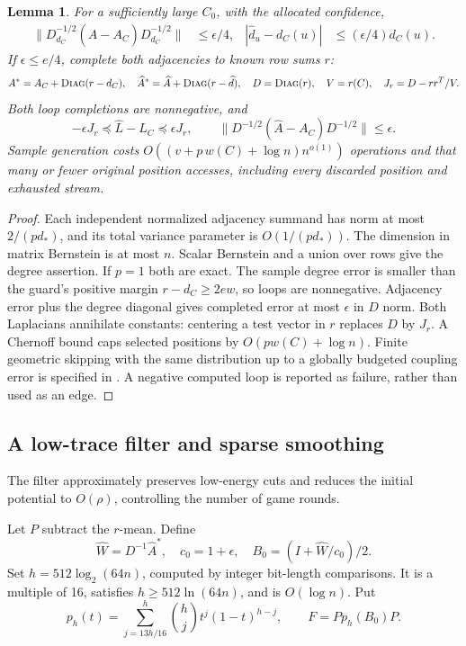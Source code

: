 \documentclass[11pt]{article}
\newtheorem{lemma}[theorem]{Lemma}
\theoremstyle{remark}
\newcommand{\diag}{\textsc{Diag}}
\newcommand{\norm}[1]{\lVert#1\rVert}
\begin{document}
\begin{lemma}\label{struct27:lem:sample}
For a sufficiently large $C_0$, with the allocated confidence,
\begin{align}
 \norm{D_{d_C}^{-1/2}(\widehat A-A_C)D_{d_C}^{-1/2}}&\le\epsilon/4,
 &|\widehat d_u-d_C(u)|&\le(\epsilon/4)d_C(u).\label{struct27:eq:rawsample}
\end{align}
If $\epsilon\le e/4$, complete both adjacencies to known row sums $r$:
\[
 A^*=A_C+\diag(r-d_C),\quad
 \widehat A^*=\widehat A+\diag(r-\widehat d),\quad
 D=\diag(r),\quad V=r(C),\quad J_r=D-rr^T/V.
\]
Both loop completions are nonnegative, and
\begin{equation}\label{struct27:eq:laperror}
 -\epsilon J_r\preceq\widehat L-L_C\preceq\epsilon J_r,
 \qquad \norm{D^{-1/2}(\widehat A-A_C)D^{-1/2}}\le\epsilon.
\end{equation}
Sample generation costs $O((v+p\,w(C)+\log n)n^{o(1)})$ operations and that many or
fewer original position accesses, including every discarded position and
exhausted stream.
\end{lemma} \begin{proof} Each independent normalized adjacency summand has norm
at most $2/(pd_*)$, and its total variance parameter is $O(1/(pd_*))$.
The dimension in matrix Bernstein is at most $n$.
Scalar Bernstein and a union over rows give the degree assertion.
If $p=1$ both are exact.
The sample degree error is smaller than the guard's positive margin
$r-d_C\ge2ew$, so loops are nonnegative.
Adjacency error plus the degree diagonal gives completed error at most
$\epsilon$ in $D$ norm.
Both Laplacians annihilate constants: centering a test vector in $r$ replaces
$D$ by $J_r$.
A Chernoff bound caps selected positions by $O(pw(C)+\log n)$.
Finite geometric skipping with the same distribution up to a globally budgeted
coupling error is specified in .
A negative computed loop is reported as failure, rather than used as an edge.
\end{proof}

\subsection{A low-trace filter and sparse smoothing}

The filter approximately preserves low-energy cuts and reduces the initial
potential to $O(\rho)$, controlling the number of game rounds.

Let $P$ subtract the $r$-mean.
Define
\[
 \widehat W=D^{-1}\widehat A^*,\quad c_0=1+\epsilon,
 \quad B_0=(I+\widehat W/c_0)/2.
\]
Set $h=512 \log_2(64n) $, computed by integer bit-length comparisons.
It is a multiple of 16, satisfies $h\ge512\ln(64n)$, and is $O(\log n)$.
Put
\begin{equation}\label{struct27:eq:filter}
 p_h(t)=\sum_{j=13h/16}^h{h\choose j}t^j(1-t)^{h-j},
 \qquad F=Pp_h(B_0)P.
\end{equation}
\end{document}
